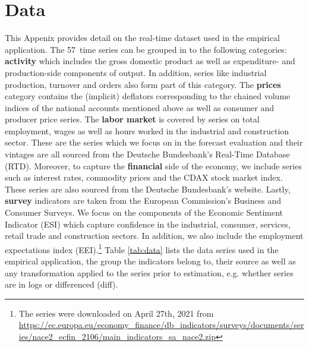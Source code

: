 \documentclass[notitlepage,a4paper,12pt]{article}
\newcommand\NumSeries{57}
\begin{document}
\section{Data}
\label{app:data}
This Appenix provides detail on the real-time dataset used in the empirical application. The \NumSeries\ time series can be grouped in to the following categories: \textbf{activity} which includes the gross domestic product as well as expenditure- and production-side components of output. In addition, series like industrial production, turnover and orders also form part of this category. The \textbf{prices} category contains the (implicit) deflators corresponding to the chained volume indices of the national accounts mentioned above as well as consumer and producer price series. The \textbf{labor market} is covered by series on total employment, wages as well as hours worked in the industrial and construction sector. These are the series which we focus on in the forecast evaluation and their vintages are all sourced from the Deutsche Bundesbank's Real-Time Database (RTD). Moreover, to capture the \textbf{financial} side of the economy, we include series such as interest rates, commodity prices and the CDAX stock market index. These series are also sourced from the Deutsche Bundesbank's website. Lastly, \textbf{survey} indicators are taken from the European Commission's Business and Consumer Surveys. We focus on the components of the Economic Sentiment Indicator (ESI) which capture confidence in the industrial, consumer, services, retail trade and construction sectors. In addition, we also include the employment expectations index (EEI).\footnote{The series were downloaded on April 27th, 2021 from \url{https://ec.europa.eu/economy_finance/db_indicators/surveys/documents/series/nace2_ecfin_2106/main_indicators_sa_nace2.zip}} Table \ref{tab:data} lists the data series used in the empirical application, the group the indicators belong to, their source as well as any transformation applied to the series prior to estimation, e.g. whether series are in logs or differenced (diff). 
\end{document}
